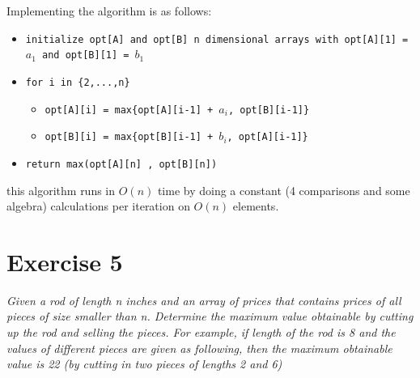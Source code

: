 \documentclass{amsart}
\begin{document}
Implementing the algorithm is as follows:
{\small
    \begin{itemize}
        \item \texttt{initialize opt[A] and opt[B] n dimensional arrays with opt[A][1] = $a_1$ and opt[B][1] = $b_1$}
        \item \texttt{for i in \{2,...,n\}}
            \begin{itemize}
                \item \texttt{opt[A][i] = max\{opt[A][i-1] + $a_i$, opt[B][i-1]\}}
                \item \texttt{opt[B][i] = max\{opt[B][i-1] + $b_i$, opt[A][i-1]\}}
            \end{itemize}
        \item \texttt{return max(opt[A][n] , opt[B][n])}
    \end{itemize}
}
this algorithm runs in $O(n)$ time by doing a constant (4 comparisons and some algebra) calculations per iteration on $O(n)$ elements.

\section{Exercise 5}
\emph{Given a rod of length n inches and an array of prices that contains prices of all pieces of size smaller than n. Determine the maximum value
obtainable by cutting up the rod and selling the pieces. For example, if length of the rod is 8 and the values of different pieces are given as following, 
then the maximum obtainable value is 22 (by cutting in two pieces of lengths 2 and 6)}
\end{document}

